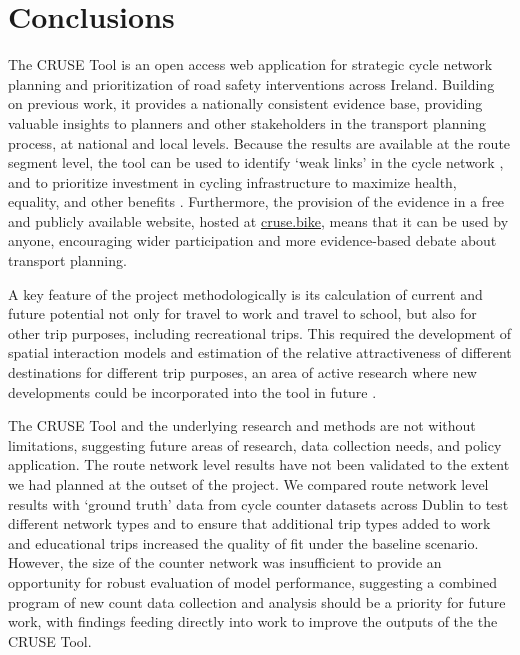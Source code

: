 \documentclass[
  super,
  preprint,
  3p]{elsarticle}
\begin{document}
\hypertarget{sec-conclusions}{%
\section{Conclusions}\label{sec-conclusions}}

The CRUSE Tool is an open access web application for strategic cycle
network planning and prioritization of road safety interventions across
Ireland. Building on previous work, it provides a nationally consistent
evidence base, providing valuable insights to planners and other
stakeholders in the transport planning process, at national and local
levels. Because the results are available at the route segment level,
the tool can be used to identify `weak links' in the cycle network
\citep{vybornova2022}, and to prioritize investment in cycling
infrastructure to maximize health, equality, and other benefits
\citep{mahfouz, woodcock2021}. Furthermore, the provision of the
evidence in a free and publicly available website, hosted at
\href{https://cruse.bike}{cruse.bike}, means that it can be used by
anyone, encouraging wider participation and more evidence-based debate
about transport planning.

A key feature of the project methodologically is its calculation of
current and future potential not only for travel to work and travel to
school, but also for other trip purposes, including recreational trips.
This required the development of spatial interaction models and
estimation of the relative attractiveness of different destinations for
different trip purposes, an area of active research where new
developments could be incorporated into the tool in future
\citep{hasova2022}.

The CRUSE Tool and the underlying research and methods are not without
limitations, suggesting future areas of research, data collection needs,
and policy application. The route network level results have not been
validated to the extent we had planned at the outset of the project. We
compared route network level results with `ground truth' data from cycle
counter datasets across Dublin to test different network types and to
ensure that additional trip types added to work and educational trips
increased the quality of fit under the baseline scenario. However, the
size of the counter network was insufficient to provide an opportunity
for robust evaluation of model performance, suggesting a combined
program of new count data collection and analysis should be a priority
for future work, with findings feeding directly into work to improve the
outputs of the the CRUSE Tool.
\end{document}
